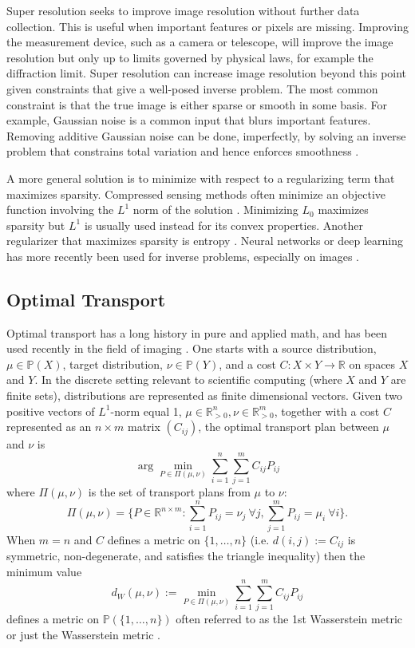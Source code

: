 \documentclass[conference]{IEEEtran}
\newcommand{\R}{{\mathbb{R}}}
\newcommand{\bbP}{{\mathbb{P}}}
\begin{document}
Super resolution seeks to improve image resolution without further data collection. This is useful when important features or pixels are missing. Improving the measurement device, such as a camera or telescope, will improve the image resolution but only up to limits governed by physical laws, for example the diffraction limit. Super resolution can increase image resolution beyond this point given constraints that give a well-posed inverse problem. The most common constraint is that the true image is either sparse or smooth in some basis. For example, Gaussian noise is a common input that blurs important features. Removing additive Gaussian noise can be done, imperfectly, by solving an inverse problem that constrains total variation and hence enforces smoothness \cite{ng}. 

A more general solution is to minimize with respect to a regularizing term that maximizes sparsity. Compressed sensing methods often minimize an objective function 
involving the $L^1$ norm of the solution \cite{candes}. Minimizing $L_0$ maximizes sparsity but $L^1$ is usually used instead for its convex properties. Another regularizer that maximizes sparsity is entropy \cite{gull, cornwell1985}. Neural networks or deep learning has more recently been used for inverse problems, especially on images \cite{ongie}.

\subsection{Optimal Transport}
Optimal transport has a long history in pure and applied math, and has been used recently in the field of imaging \cite{cuturi}. One starts with a source distribution, $\mu\in\bbP(X)$, target distribution, $\nu\in\bbP(Y)$, and a cost $C:X \times Y \rightarrow \R$ on spaces $X$ and $Y$. In the discrete setting relevant to scientific computing (where $X$ and $Y$ are finite sets), distributions are represented as finite dimensional vectors.
Given two positive vectors of $L^1$-norm equal 1, $\mu\in\R^n_{>0}, \nu \in \R^m_{>0}$, together with a cost $C$ represented as an $n\times m$ matrix $(C_{ij})$, the optimal transport plan between $\mu$ and $\nu$ is 
\begin{equation} \label{eq:OTPlan} 
    \arg\min_{P\in \Pi(\mu,\nu)} \sum_{i=1}^n \sum_{j=1}^m C_{ij} P_{ij} 
\end{equation}
where $\Pi(\mu,\nu)$ is the set of transport plans from $\mu$ to $\nu$:
$$ \Pi(\mu,\nu) = \{P\in\R^{n\times m}: \sum_{i=1}^n P_{ij} = \nu_j\ \forall j, \sum_{j=1}^m P_{ij} = \mu_i\ \forall i\}. $$
When $m=n$ and $C$ defines a metric on $\{1,\ldots,n\}$ (i.e. $d(i,j) := C_{ij}$ is symmetric, non-degenerate, and satisfies the triangle inequality) then the minimum value
\begin{equation} \label{eq:Wdist} 
    d_W(\mu,\nu) := \min_{P\in \Pi(\mu,\nu)} \sum_{i=1}^n \sum_{j=1}^m C_{ij} P_{ij} 
\end{equation}
defines a metric on $\bbP(\{1,\ldots,n\})$ often referred to as the 1st Wasserstein metric or just the Wasserstein metric \cite{villani}.
\end{document}

